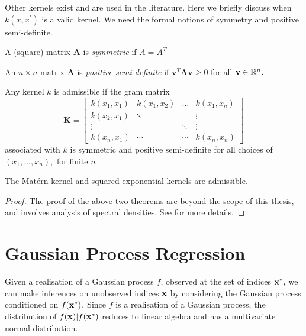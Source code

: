 Other kernels exist and are used in the literature. Here we briefly discuss when
$k(x, x^\prime)$ is a valid kernel. We need the formal notions of symmetry and
positive semi-definite.

\begin{definition}[Symmetric]\label{def:sym_mat}
    A (square) matrix $\mathbf{A}$ is \emph{symmetric} if $A = A^T$
\end{definition}

\begin{definition}\label{def:pos_def_mat}
    An $n\times n$ matrix $\mathbf{A}$ is \emph{positive semi-definite} if
    $\mathbf{v}^T\mathbf{A}\mathbf{v} \geq 0$ for all $\mathbf{v}\in\mathbb{R}^n.$
\end{definition}

\begin{theorem}
    Any kernel $k$ is admissible if the gram matrix
    $$\mathbf{K} = \begin{bmatrix}
            k(x_1, x_1) & k(x_1, x_2) & \dots  & k(x_1, x_n) \\
            k(x_2, x_1) & \ddots      &        & \vdots      \\
            \vdots      &             & \ddots & \vdots      \\
            k(x_n, x_1) & \cdots      & \cdots & k(x_n, x_n)
        \end{bmatrix}$$ associated with $k$ is symmetric and positive
    semi-definite for all choices of $(x_1, \dots, x_n),$ for finite $n$

\end{theorem}
\begin{theorem}
    The Mat\'ern kernel and squared exponential kernels are admissible.
\end{theorem}
\begin{proof}
    The proof of the above two theorems are beyond the scope of this thesis,
    and involves analysis of spectral densities.
    See \cite[chapter 4]{rasmussen_gaussian_2008} for more details.
\end{proof}

\section{Gaussian Process Regression}

Given a realisation of a Gaussian process $f$, observed at the set of indices
$\mathbf{x}^\ast,$ we can make inferences on unobserved indices $\mathbf{x}$ by considering the
Gaussian process conditioned on $f(\mathbf{x}^\ast).$
Since $f$ is a realisation of a Gaussian
process, the distribution of $f(\mathbf{x}) | f(\mathbf{x}^\ast)$ reduces to linear algebra
and has a multivariate normal distribution.

